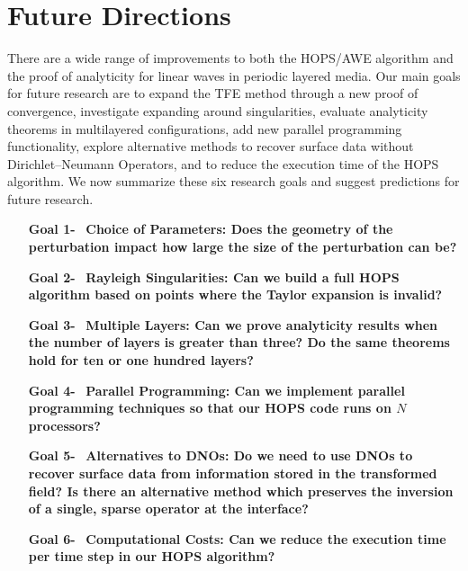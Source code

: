 \section{Future Directions}
\label{Sec: Future Directions}
There are a wide range of improvements to both the HOPS/AWE algorithm and the proof of analyticity for linear waves in periodic layered media. Our main goals for future research are to expand the TFE method through a new proof of convergence, investigate expanding around singularities, evaluate analyticity theorems in multilayered configurations, add new parallel programming functionality, explore alternative methods to recover surface data without Dirichlet--Neumann Operators, and to reduce the execution time of the HOPS algorithm. We now summarize these six research goals and suggest predictions for future research.
\begin{enumerate}[labelsep=0ex,align=left,start=1]
    \item[\textbf{Goal 1-}] ~\textbf{Choice of Parameters: Does the geometry of the perturbation impact how large the size of the perturbation can be? }
    \item[\textbf{Goal 2-}] ~\textbf{Rayleigh Singularities: Can we build a full HOPS algorithm based on points where the Taylor expansion is invalid? }
    \item[\textbf{Goal 3-}] ~\textbf{Multiple Layers: Can we prove analyticity results when the number of layers is greater than three? Do the same theorems hold for ten or one hundred layers?} 
    \item[\textbf{Goal 4-}] ~\textbf{{Parallel Programming}: Can we implement parallel programming techniques so that our HOPS code runs on $N$ processors? }
    \item[\textbf{Goal 5-}] ~\textbf{{Alternatives to DNOs}: Do we need to use DNOs to recover surface data from information stored in the transformed field? Is there an alternative method which preserves the inversion of a single, sparse operator at the interface?   }
    \item[\textbf{Goal 6-}] ~\textbf{Computational Costs: Can we reduce the execution time per time step in our HOPS algorithm?} 
\end{enumerate}
